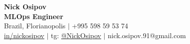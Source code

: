 \documentclass[letterpaper,12pt]{fed-res} %
\begin{document}
\begin{center}
  \textbf{\Huge Nick Osipov} \\ \vspace{1pt}
  \textbf{MLOps Engineer} \\ \vspace{1pt}
  Brazil, Florianopolis $|$ +995 598 59 53 74 \\ \vspace{1pt}  
  \href{https://www.linkedin.com/in/nickosipov/}{in/nickosipov} $|$ tg: \href{https://t.me/NickOsipov}{@NickOsipov} $|$ nick.osipov.91@gmail.com \\ \vspace{1pt}
\end{center}







\end{document}
